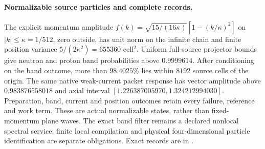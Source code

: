 \paragraph{Normalizable source particles and complete records.}
The explicit momentum amplitude
$f(k)=\sqrt{15/(16\kappa)}[1-(k/\kappa)^2]$ on $|k|\leq\kappa=1/512$,
zero outside, has unit norm on the infinite chain and finite position
variance $5/(2\kappa^2)=655360$ cell$^2$. Uniform full-source projector
bounds give neutron and proton band probabilities above $0.9999614$.
After conditioning on the band outcome, more than $98.4025\%$ lies within
$8192$ source cells of the origin. The same native weak-current packet
response has vector amplitude above $0.983876558018$ and axial interval
$[1.226387005970,1.324212994030]$. Preparation, band, current and position
outcomes retain every failure, reference and work term. These are actual
normalizable states, rather than fixed-momentum plane waves. The exact
band filter remains a declared nonlocal spectral service; finite local
compilation and physical four-dimensional particle identification are
separate obligations. Exact records are in
.

